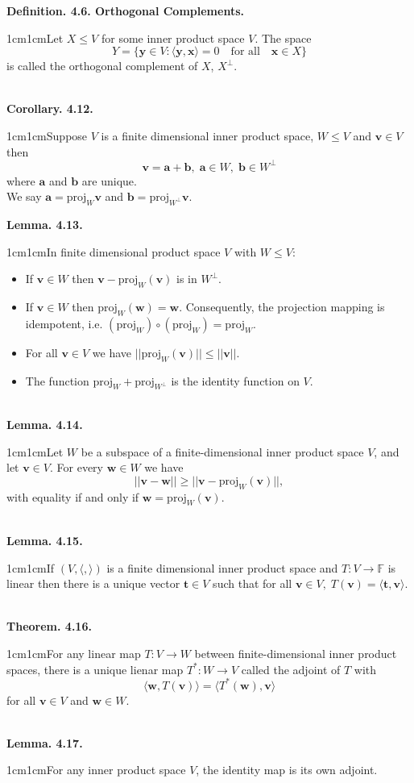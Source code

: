 \documentclass{article}
\newcommand{\vect}[1]{\mathbf{#1}}
\newcommand{\definition}[2]{\textbf{Definition. #1.}\begin{adjustwidth}{1cm}{1cm}#2\end{adjustwidth}}
\newcommand{\theorem}[2]{\textbf{Theorem. #1.}\begin{adjustwidth}{1cm}{1cm}#2\end{adjustwidth}}
\newcommand{\lemma}[2]{\textbf{Lemma. #1.}\begin{adjustwidth}{1cm}{1cm}#2\end{adjustwidth}}
\newcommand{\corollary}[2]{\textbf{Corollary. #1.}\begin{adjustwidth}{1cm}{1cm}#2\end{adjustwidth}}
\begin{document}
\definition{4.6. Orthogonal Complements}{Let $X \leq V$ for some inner product space $V$. The space \[Y = \{ \vect{y} \in V: \langle \vect{y}, \vect{x} \rangle = 0 \quad \text{for all} \quad \vect{x} \in X \}\] is called the orthogonal complement of $X$, $X^{\perp}$.}~\\
\corollary{4.12}{Suppose $V$ is a finite dimensional inner product space, $W \leq V$ and $\vect{v} \in V$ then \[\vect{v} = \vect{a} + \vect{b}, \; \vect{a} \in W, \; \vect{b} \in W^{\perp}\] where $\vect{a}$ and $\vect{b}$ are unique.\\We say $\vect{a} = \text{proj}_W \vect{v}$ and $\vect{b} = \text{proj}_{W^{\perp}} \vect{v}$.}\newpage
\lemma{4.13}{In finite dimensional product space $V$ with $W \leq V$:
\begin{itemize}
  \item If $\vect{v} \in W$ then $\vect{v} - \text{proj}_W(\vect{v})$ is in $W^{\perp}$.
  \item If $\vect{v} \in W$ then $\text{proj}_W(\vect{w}) = \vect{w}$. Consequently, the projection mapping is idempotent, i.e. $(\text{proj}_W) \circ (\text{proj}_W) = \text{proj}_W$.
  \item For all $\vect{v} \in V$ we have $|| \text{proj}_W(\vect{v})|| \leq || \vect{v} ||$.
  \item The function $\text{proj}_W + \text{proj}_{W^\perp}$ is the identity function on $V$.
\end{itemize}
}~\\
\lemma{4.14}{Let $W$ be a subspace of a finite-dimensional inner product space $V$, and let $\vect{v} \in V$. For every $\vect{w} \in W$ we have \[||\vect{v}-\vect{w}|| \geq ||\vect{v} - \text{proj}_W(\vect{v})||,\]with equality if and only if $\vect{w} = \text{proj}_W(\vect{v})$.}~\\
\lemma{4.15}{If $(V, \langle , \rangle)$ is a finite dimensional inner product space and $T : V \rightarrow \mathbb{F}$ is linear then there is a unique vector $\vect{t} \in V$ such that for all $\vect{v} \in V, \; T(\vect{v}) = \langle \vect{t}, \vect{v} \rangle$.}~\\
\theorem{4.16}{For any linear map $T : V \rightarrow W$ between finite-dimensional inner product spaces, there is a unique lienar map $T^*:W \rightarrow V$ called the adjoint of $T$ with \[\langle \vect{w}, T(\vect{v}) \rangle = \langle T^*(\vect{w}), \vect{v} \rangle\]for all $\vect{v} \in V$ and $\vect{w} \in W$.}~\\
\lemma{4.17}{For any inner product space $V$, the identity map is its own adjoint.}\newpage
\end{document}
